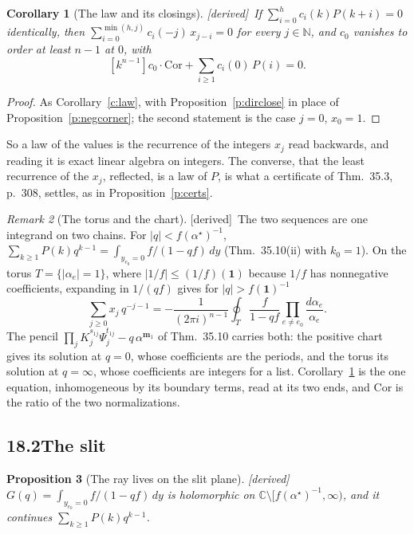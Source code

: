 \documentclass[11pt]{article}
\newcommand{\one}{\mathbf 1}
\newcommand{\mvec}{\mathbf m}
\theoremstyle{plain}
\newtheorem{proposition}{Proposition}[section]
\newtheorem{corollary}[proposition]{Corollary}
\theoremstyle{definition}
\theoremstyle{remark}
\newtheorem{remark}[proposition]{Remark}
\newcommand{\derived}{\textup{[derived]}}
\begin{document}
\begin{corollary}[The law and its closings]\label{c:dirlaw}\derived\
If $\sum_{i=0}^hc_i(k)P(k+i)=0$ identically, then $\sum_{i=0}^{\min(h,j)}c_i(-j)\,x_{j-i}=0$ for every $j\in\mathbb N$, and $c_0$ vanishes to order at least $n-1$ at $0$, with
\[
[k^{n-1}]c_0\cdot\mathrm{Cor}+\sum_{i\ge1}c_i(0)\,P(i)=0 .
\]
\end{corollary}

\begin{proof}
As Corollary~\ref{c:law}, with Proposition~\ref{p:dirclose} in place of Proposition~\ref{p:negcorner}; the second statement is the case $j=0$, $x_0=1$.
\end{proof}

So a law of the values is the recurrence of the integers $x_j$ read backwards, and reading it is exact linear algebra on integers. The converse, that the least recurrence of the $x_j$, reflected, is a law of $P$, is what a certificate of Thm.~35.3, p.~308, settles, as in Proposition~\ref{p:certs}.

\begin{remark}[The torus and the chart]\label{r:twochains}\derived\
The two sequences are one integrand on two chains. For $|q|<f(\alpha^\star)^{-1}$, $\sum_{k\ge1}P(k)q^{k-1}=\int_{y_{e_0}=0}f/(1-qf)\,dy$ (Thm.~35.10(ii) with $k_0=1$). On the torus $T=\{|\alpha_e|=1\}$, where $|1/f|\le(1/f)(\one)$ because $1/f$ has nonnegative coefficients, expanding in $1/(qf)$ gives for $|q|>f(\one)^{-1}$
\[
\sum_{j\ge0}x_j\,q^{-j-1}=-\frac1{(2\pi i)^{n-1}}\oint_{T}\frac{f}{1-qf}\prod_{e\ne e_0}\frac{d\alpha_e}{\alpha_e}.
\]
The pencil $\prod_jK_j^{s_{1j}}\Psi_j^{t_{1j}}-q\,\alpha^{\mvec_1}$ of Thm.~35.10 carries both: the positive chart gives its solution at $q=0$, whose coefficients are the periods, and the torus its solution at $q=\infty$, whose coefficients are integers for a list. Corollary~\ref{c:dirlaw} is the one equation, inhomogeneous by its boundary terms, read at its two ends, and $\mathrm{Cor}$ is the ratio of the two normalizations.
\end{remark}

\subsection*{18.2\quad The slit}

\begin{proposition}[The ray lives on the slit plane]\label{p:slit}\derived\
$G(q)=\int_{y_{e_0}=0}f/(1-qf)\,dy$ is holomorphic on $\mathbb C\setminus[f(\alpha^\star)^{-1},\infty)$, and it continues $\sum_{k\ge1}P(k)q^{k-1}$.
\end{proposition}
\end{document}
